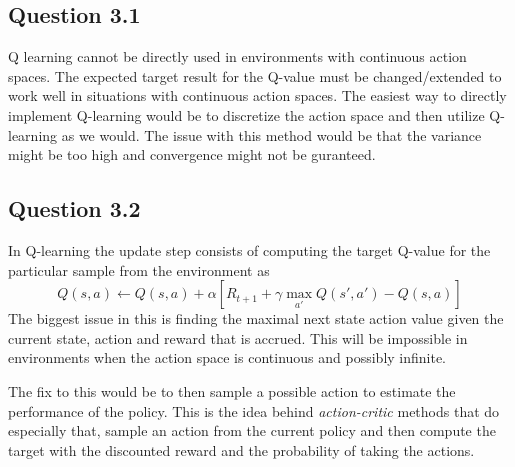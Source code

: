 \documentclass[a4paper]{article}
\begin{document}
\subsection*{Question 3.1}
Q learning cannot be directly used in environments with continuous action spaces. The expected target result for the Q-value must be changed/extended to work well in situations with continuous action spaces. The easiest way to directly implement Q-learning would be to discretize the action space and then utilize Q-learning as we would. The issue with this method would be that the variance might be too high and convergence might not be guranteed. 
\subsection*{Question 3.2}
In Q-learning the update step consists of computing the target Q-value for the particular sample from the environment as 
\[ Q(s,a) \leftarrow Q(s,a) + \alpha\left[ R_{t+1} +\gamma\max_{a'} Q(s',a') - Q(s,a) \right]\] 
The biggest issue in this is finding the maximal next state action value given the current state, action and reward that is accrued. This will be impossible in environments when the action space is continuous and possibly infinite.

The fix to this would be to then sample a possible action to estimate the performance of the policy. This is the idea behind \textit{action-critic} methods that do especially that, sample an action from the current policy and then compute the target with the discounted reward and the probability of taking the actions. 
\end{document}
